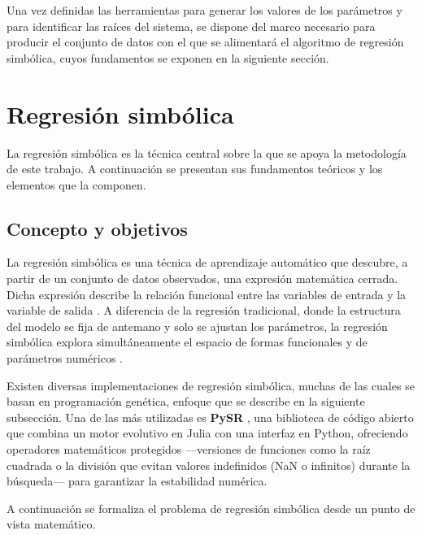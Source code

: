 Una vez definidas las herramientas para generar los valores de los parámetros y para identificar las raíces del sistema, se dispone del marco necesario para producir el conjunto de datos con el que se alimentará el algoritmo de regresión simbólica, cuyos fundamentos se exponen en la siguiente sección.

\section{Regresión simbólica} \label{sec:regresion}

La regresión simbólica es la técnica central sobre la que se apoya la metodología de este trabajo. A continuación se presentan sus fundamentos teóricos y los elementos que la componen.

\subsection{Concepto y objetivos}

La regresión simbólica es una técnica de aprendizaje automático que descubre, a partir de un conjunto de datos observados, una expresión matemática cerrada. Dicha expresión describe la relación funcional entre las variables de entrada y la variable de salida \cite{koza1992genetic}. A diferencia de la regresión tradicional, donde la estructura del modelo se fija de antemano y solo se ajustan los parámetros, la regresión simbólica explora simultáneamente el espacio de formas funcionales y de parámetros numéricos \cite{schmidt2009distilling}.

Existen diversas implementaciones de regresión simbólica, muchas de las cuales se basan en programación genética, enfoque que se describe en la siguiente subsección. Una de las más utilizadas es \textbf{PySR} \cite{cranmer2023pysr}, una biblioteca de código abierto que combina un motor evolutivo en Julia con una interfaz en Python, ofreciendo operadores matemáticos protegidos ---versiones de funciones como la raíz cuadrada o la división que evitan valores indefinidos (NaN o infinitos) durante la búsqueda--- para garantizar la estabilidad numérica.

A continuación se formaliza el problema de regresión simbólica desde un punto de vista matemático.

